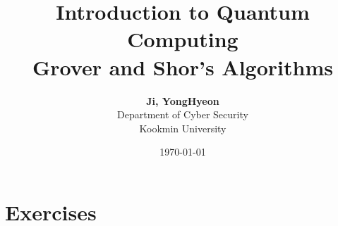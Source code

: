 \documentclass[11pt,a4paper]{report}
\title{\Huge \textbf{Introduction to Quantum Computing}\\[0.5em]
	\LARGE Grover and Shor’s Algorithms}
\author{\Large\textbf{Ji, YongHyeon} \\[.5cm] Department of Cyber Security\\ Kookmin University}
\date{\today}
\theoremstyle{definitionstyle}
\begin{document}
\maketitle
\tableofcontents
\newpage
	
	
	

	
\appendix

%

\chapter{Exercises}

\end{document}
